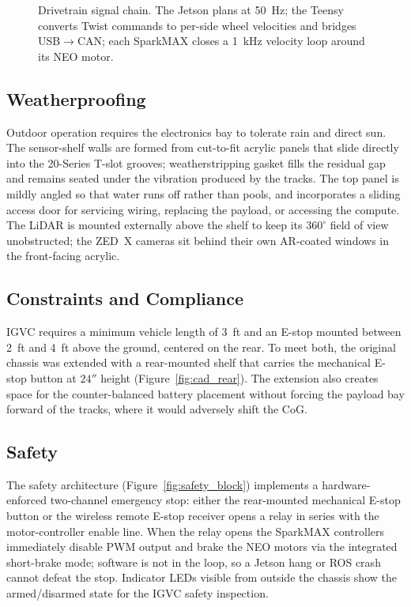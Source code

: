 \documentclass[11pt, letterpaper]{article}
\begin{document}
\begin{figure}[H]
    \centering
    
    \caption{Drivetrain signal chain. The Jetson plans at 50~Hz; the Teensy converts
    Twist commands to per-side wheel velocities and bridges USB$\rightarrow$CAN; each
    SparkMAX closes a 1~kHz velocity loop around its NEO motor.}
    \label{fig:drivetrain_block}
\end{figure}

\subsection{Weatherproofing}

Outdoor operation requires the electronics bay to tolerate rain and direct sun. The
sensor-shelf walls are formed from cut-to-fit acrylic panels that slide directly into the
20-Series T-slot grooves; weatherstripping gasket fills the residual gap and remains
seated under the vibration produced by the tracks. The top panel is mildly angled so
that water runs off rather than pools, and incorporates a sliding access door for
servicing wiring, replacing the payload, or accessing the compute. The LiDAR is mounted
externally above the shelf to keep its $360^\circ$ field of view unobstructed; the ZED~X
cameras sit behind their own AR-coated windows in the front-facing acrylic.

\subsection{Constraints and Compliance}

IGVC requires a minimum vehicle length of 3~ft and an E-stop mounted between 2~ft and
4~ft above the ground, centered on the rear. To meet both, the original chassis was
extended with a rear-mounted shelf that carries the mechanical E-stop button at $24''$
height (Figure~\ref{fig:cad_rear}). The extension also creates space for the
counter-balanced battery placement without forcing the payload bay forward of the
tracks, where it would adversely shift the CoG.

\subsection{Safety}

The safety architecture (Figure~\ref{fig:safety_block}) implements a hardware-enforced
two-channel emergency stop: either the rear-mounted mechanical E-stop button or the
wireless remote E-stop receiver opens a relay in series with the motor-controller
enable line. When the relay opens the SparkMAX controllers immediately disable PWM
output and brake the NEO motors via the integrated short-brake mode; software is not in
the loop, so a Jetson hang or ROS crash cannot defeat the stop. Indicator LEDs visible
from outside the chassis show the armed/disarmed state for the IGVC safety inspection.
\end{document}

